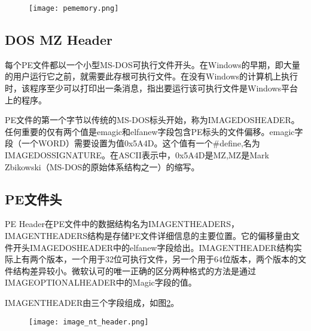 \begin{figure}[htbp]
	\centering
	\texttt{[image: pememory.png]}\\

	\label{sec2:subsec3:pememory}
\end{figure}




\subsection{DOS MZ Header}

每个PE文件都以一个小型MS-DOS可执行文件开头\cite{向飞2019一种基于}。在Windows的早期，即大量的用户运行它之前，就需要此存根可执行文件\cite{吕苗苗2019基于}。在没有Windows的计算机上执行时，该程序至少可以打印出一条消息，指出要运行该可执行文件是Windows平台上的程序。

PE文件的第一个字节以传统的MS-DOS标头开始\cite{2018Enhance}，称为IMAGE\textunderscore DOS\textunderscore HEADER。任何重要的仅有两个值是e\textunderscore magic和e\textunderscore lfanew字段包含PE标头的文件偏移。e\textunderscore magic字段（一个WORD）需要设置为值0x5A4D。这个值有一个\#define,名为IMAGE\textunderscore DOS\textunderscore SIGNATURE。在ASCII表示中，0x5A4D是MZ,MZ是Mark Zbikowski（MS-DOS的原始体系结构之一）的缩写。


\subsection{PE文件头}

PE Header在PE文件中的数据结构名为IMAGE\textunderscore NT\textunderscore HEADERS，IMAGE\textunderscore NT\textunderscore HEADERS结构是存储PE文件详细信息的主要位置。它的偏移量由文件开头IMAGE\textunderscore DOS\textunderscore HEADER中的e\textunderscore lfanew字段给出。IMAGE\textunderscore NT\textunderscore HEADER结构实际上有两个版本，一个用于32位可执行文件，另一个用于64位版本，两个版本的文件结构差异较小\cite{2018Construction}。微软认可的唯一正确的区分两种格式的方法是通过IMAGE\textunderscore OPTIONAL\textunderscore HEADER中的Magic字段的值。

IMAGE\textunderscore NT\textunderscore HEADER由三个字段组成，如图\ref{sec2:subsec3:image_nt_header}。

\begin{figure}[htbp]
	\centering
	\texttt{[image: image\_nt\_header.png]}\\
	\label{sec2:subsec3:image_nt_header}
\end{figure}

